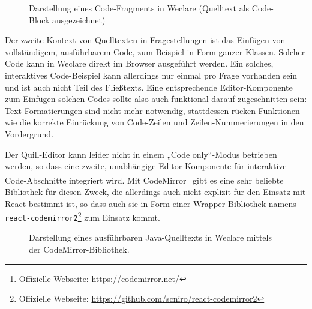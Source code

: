 \begin{figure}[H]
    \centering
    \setlength{\fboxsep}{0pt}
    \setlength{\fboxrule}{0.5pt}
    \caption[Darstellung eines Code-Fragments in Weclare]{Darstellung eines Code-Fragments in Weclare (Quelltext als Code-Block ausgezeichnet)}
    \label{abb:weclare_code_fragment}
\end{figure}

Der zweite Kontext von Quelltexten in Fragestellungen ist das Einfügen von vollständigem, ausführbarem Code, zum Beispiel in Form ganzer Klassen. Solcher Code kann in Weclare direkt im Browser ausgeführt werden. Ein solches, interaktives Code-Beispiel kann allerdings nur einmal pro Frage vorhanden sein und ist auch nicht Teil des Fließtexts. Eine entsprechende Editor-Komponente zum Einfügen solchen Codes sollte also auch funktional darauf zugeschnitten sein: Text-Formatierungen sind nicht mehr notwendig, stattdessen rücken Funktionen wie die korrekte Einrückung von Code-Zeilen und Zeilen-Nummerierungen in den Vordergrund.

Der Quill-Editor kann leider nicht in einem „Code only“-Modus betrieben werden, so dass eine zweite, unabhängige Editor-Komponente für interaktive Code-Abschnitte integriert wird. Mit CodeMirror\footnote{Offizielle Webseite: \url{https://codemirror.net/}} gibt es eine sehr beliebte Bibliothek für diesen Zweck, die allerdings auch nicht explizit für den Einsatz mit React bestimmt ist, so dass auch sie in Form einer Wrapper-Bibliothek namens \texttt{react-codemirror2}\footnote{Offizielle Webseite: \url{https://github.com/scniro/react-codemirror2}} zum Einsatz kommt.



\begin{figure}[H]
    \centering
    \setlength{\fboxsep}{0pt}
    \setlength{\fboxrule}{0.5pt}
    \caption[Darstellung eines ausführbaren Java-Quelltexts in Weclare]{Darstellung eines ausführbaren Java-Quelltexts in Weclare mittels der CodeMirror-Bibliothek.}
    \label{abb:weclare_codemirror}
\end{figure}
